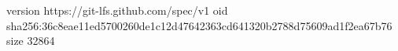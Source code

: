 version https://git-lfs.github.com/spec/v1
oid sha256:36c8eae11ed5700260de1c12d47642363cd641320b2788d75609ad1f2ea67b76
size 32864
